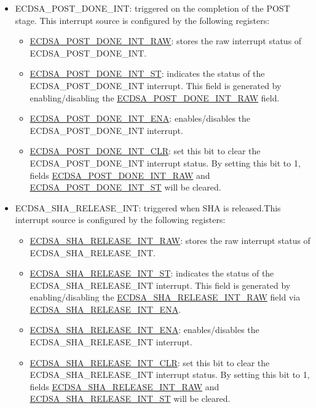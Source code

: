 \documentclass[main\_\_EN.tex]{subfiles}
\begin{document}
\begin{itemize}
\begin{itemize}
	      \end{itemize}
	\item \label{int:ECDSAPOSTDONEINT}ECDSA\_POST\_DONE\_INT: triggered on the completion of the POST stage. This interrupt source is configured by the following registers:
	      \begin{itemize}
		      \item \hyperref[fielddesc:ECDSAPOSTDONEINTRAW]{ECDSA\_POST\_DONE\_INT\_RAW}: stores the raw interrupt status of ECDSA\_POST\_DONE\_INT.
		      \item \hyperref[fielddesc:ECDSAPOSTDONEINTST]{ECDSA\_POST\_DONE\_INT\_ST}: indicates the status of the ECDSA\_POST\_DONE\_INT interrupt. This field is generated by enabling/disabling the \hyperref[fielddesc:ECDSAPOSTDONEINTRAW]{ECDSA\_POST\_DONE\_INT\_RAW} field.
		      \item \hyperref[fielddesc:ECDSAPOSTDONEINTENA]{ECDSA\_POST\_DONE\_INT\_ENA}: enables/disables the ECDSA\_POST\_DONE\_INT interrupt.
		      \item \hyperref[fielddesc:ECDSAPOSTDONEINTCLR]{ECDSA\_POST\_DONE\_INT\_CLR}: set this bit to clear the ECDSA\_POST\_DONE\_INT interrupt status. By setting this bit to 1, fields \hyperref[fielddesc:ECDSAPOSTDONEINTRAW]{ECDSA\_POST\_DONE\_INT\_RAW} and  \hyperref[fielddesc:ECDSAPOSTDONEINTST]{ECDSA\_POST\_DONE\_INT\_ST} will be cleared.
	      \end{itemize}
	\item \label{int:ECDSASHARELEASEINT}ECDSA\_SHA\_RELEASE\_INT: triggered when SHA is released.This interrupt source is configured by the following registers:
	      \begin{itemize}
		      \item \hyperref[fielddesc:ECDSASHARELEASEINTRAW]{ECDSA\_SHA\_RELEASE\_INT\_RAW}: stores the raw interrupt status of ECDSA\_SHA\_RELEASE\_INT.
		      \item \hyperref[fielddesc:ECDSASHARELEASEINTST]{ECDSA\_SHA\_RELEASE\_INT\_ST}: indicates the status of the ECDSA\_SHA\_RELEASE\_INT interrupt. This field is generated by enabling/disabling the \hyperref[fielddesc:ECDSASHARELEASEINTRAW]{ECDSA\_SHA\_RELEASE\_INT\_RAW} field via \hyperref[fielddesc:ECDSASHARELEASEINTENA]{ECDSA\_SHA\_RELEASE\_INT\_ENA}.
		      \item \hyperref[fielddesc:ECDSASHARELEASEINTENA]{ECDSA\_SHA\_RELEASE\_INT\_ENA}: enables/disables the ECDSA\_SHA\_RELEASE\_INT interrupt.
		      \item \hyperref[fielddesc:ECDSASHARELEASEINTCLR]{ECDSA\_SHA\_RELEASE\_INT\_CLR}: set this bit to clear the ECDSA\_SHA\_RELEASE\_INT interrupt status. By setting this bit to 1, fields \hyperref[fielddesc:ECDSASHARELEASEINTRAW]{ECDSA\_SHA\_RELEASE\_INT\_RAW} and  \hyperref[fielddesc:ECDSASHARELEASEINTST]{ECDSA\_SHA\_RELEASE\_INT\_ST} will be cleared.
	      \end{itemize}
\end{itemize}
\end{document}
